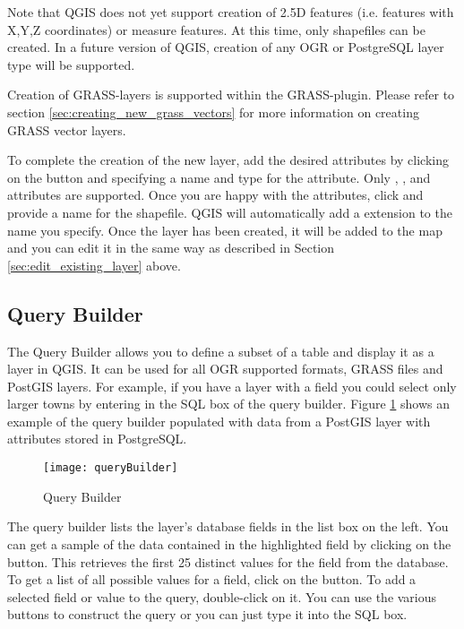 Note that QGIS does not yet support creation of 2.5D
features (i.e. features with X,Y,Z coordinates) or measure features. At this
time, only shapefiles can be created. In a future version of QGIS, creation of
any OGR or PostgreSQL layer type will be supported. 

Creation of GRASS-layers is supported within the GRASS-plugin. Please refer to section
\ref{sec:creating_new_grass_vectors} for more information on creating GRASS vector 
layers.

To complete the creation of the new layer, add the desired attributes by
clicking on the  button and specifying a name and type for the
attribute. Only , , and  attributes are supported. Once you
are happy with the attributes, click  and provide a name for the shapefile.
QGIS will automatically add a  extension to the name you specify.  Once
the layer has been created, it will be added to the map and you can edit it in
the same way as described in Section \ref{sec:edit_existing_layer} above. 

\subsection{Query Builder}\label{sec:query_builder}

The Query Builder allows you to define a subset of a table and display
it as a layer in QGIS. It can be used for all OGR supported formats, GRASS 
files and PostGIS layers. For example, if you have a  layer with a
 field you could select only larger towns by entering
 in the SQL box of the query builder. Figure
\ref{fig:query_builder} shows an example of the query builder populated with
data from a PostGIS layer with attributes stored in PostgreSQL. 

\begin{figure}[ht]
  \begin{center}
    \caption{Query Builder}\label{fig:query_builder}\smallskip
    \texttt{[image: queryBuilder]}
  \end{center}  
\end{figure}

The query builder lists the layer's database
fields in the list box on the left. You can get a sample of the data
contained in the highlighted field by clicking on the  button. This retrieves the first 25 distinct values
for the field from the database. To get a list of all possible values for a
field, click on the  button. To add a selected field or value to the query, double-click on
it. You can use the various buttons to
construct the query or you can just type it into the SQL box.

